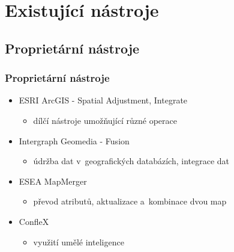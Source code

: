 \documentclass[unicode,bookmarksnumbered]{beamer}
\begin{document}
\section{Existující nástroje} %

  \subsection{Proprietární nástroje}
  \begin{frame}
    \frametitle{Proprietární nástroje}
     \begin{itemize}
      \item ESRI ArcGIS - Spatial Adjustment, Integrate
	  \begin{itemize}
	    \item dílčí nástroje umožňující různé operace
	  \end{itemize}
      \item Intergraph Geomedia - Fusion
	  \begin{itemize}
	    \item údržba dat v~geografických databázích, %
		  integrace dat
	  \end{itemize}
      \item ESEA MapMerger
	  \begin{itemize}
	    \item převod atributů, aktualizace a~kombinace dvou map
	  \end{itemize}
      \item ConfleX
	  \begin{itemize}
	    \item využití umělé inteligence%
	  \end{itemize}
     \end{itemize}
  \end{frame}
\end{document}
